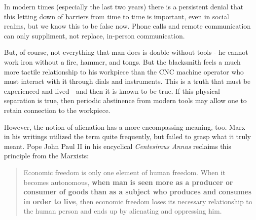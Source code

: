 \documentclass[letterpaper]{article}
\begin{document}
In modern times (especially the last two years) there is a persistent denial that this letting down of barriers from time to time is important, even in social realms, but we know this to be false now. Phone calls and remote communication can only suppliment, not replace, in-person communication.

But, of course, not everything that man does is doable without tools - he cannot work iron without a fire, hammer, and tongs. But the blacksmith feels a much more tactile relationship to his workpiece than the CNC machine operator who must interact with it through dials and instruments. This is a truth that must be experienced and lived - and then it is known to be true. If this physical separation is true, then periodic abstinence from modern tools may allow one to retain connection to the workpiece.

However, the notion of alienation has a more encompassing meaning, too. Marx in his writings utilized the term quite frequently, but failed to grasp what it truly meant. Pope John Paul II in his encyclical \textit{Centesimus Annus} reclaims this principle from the Marxists:

\begin{quote}
  Economic freedom is only one element of human freedom. When it becomes autonomous, \textbf{when man is seen more as a producer or consumer of goods than as a subject who produces and consumes in order to live}, then economic freedom loses its necessary relationship to the human person and ends up by alienating and oppressing him.
\end{quote}
\end{document}
